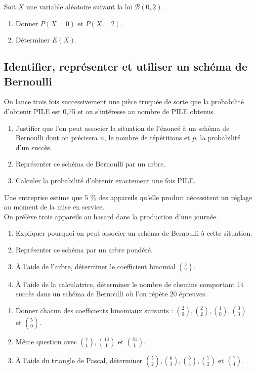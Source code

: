 \documentclass[a4paper,11pt,exos]{nsi} %
\begin{document}
\exo{}
Soit $X$ une variable aléatoire suivant la loi $\mathcal{B}(0,2)$.
\begin{enumerate}
    \item Donner $P(X=0)$ et $P(X=2)$.
    \item Déterminer $E(X)$.
\end{enumerate}

\subsection*{Identifier, représenter et utiliser un schéma de Bernoulli}
\exo{}
On lance trois fois successivement une pièce truquée de sorte que la probabilité d'obtenir PILE est 0,75 et on s'intéresse au nombre de PILE obtenus.
\begin{enumerate}
    \item Justifier que l'on peut associer la situation de l'énoncé à un schéma de Bernoulli dont on précisera $n$, le nombre de répétitions et $p$, la probabilité d'un succès.
    \item Représenter ce schéma de Bernoulli par un arbre.
    \item Calculer la probabilité d'obtenir exactement une fois PILE.
\end{enumerate}


\exo{}
Une entreprise estime que 5 \% des appareils qu'elle produit nécessitent un réglage au moment de la mise en service.\\
On prélève trois appareils au hasard dans la production d'une journée.
\begin{enumerate}
    \item Expliquer pourquoi on peut associer un schéma de Bernoulli à cette situation.
    \item Représenter ce schéma par un arbre pondéré.
    \item À l'aide de l'arbre, déterminer le coefficient binomial $\displaystyle \binom{3}{2}$.
    \item À l'aide de la calculatrice, déterminer le nombre de chemins comportant 14 succès dans un schéma de Bernoulli où l'on répète 20 épreuves.
\end{enumerate}

\exo{}
\begin{enumerate}
    \item Donner chacun des coefficients binomiaux suivants : $\displaystyle \binom{2}{0}, \binom{2}{2}, \binom{4}{0}, \binom{3}{3}$ et $\displaystyle \binom{5}{0}$.
    \item Même question avec $\displaystyle \binom{7}{1}, \binom{13}{1}$ et $\displaystyle\binom{81}{1}$.
    \item À l'aide du triangle de Pascal, déterminer $\displaystyle \binom{5}{2}, \binom{6}{3}, \binom{6}{4}, \binom{7}{2}$ et $\displaystyle\binom{7}{4}$.
\end{enumerate}
\end{document}
